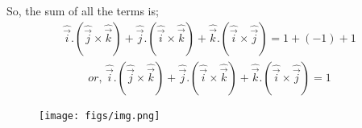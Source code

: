 \documentclass{beamer}
\providecommand{\brak}[1]{\ensuremath{\left(#1\right)}}
\theoremstyle{remark}
\numberwithin{equation}{section}
\begin{document}
\begin{frame}
So, the sum of all the terms is;
\begin{align}
\hat{\Vec{i}}.\brak{\hat{\Vec{j}} \times \hat{\Vec{k}}} + \hat{\Vec{j}}.\brak{\hat{\Vec{i}} \times \hat{\Vec{k}}} + \hat{\Vec{k}}.\brak{\hat{\Vec{i}} \times \hat{\Vec{j}}} = 1 + (-1) + 1
\end{align}
\begin{align}
or, \, \hat{\Vec{i}}.\brak{\hat{\Vec{j}} \times \hat{\Vec{k}}} + \hat{\Vec{j}}.\brak{\hat{\Vec{i}} \times \hat{\Vec{k}}} + \hat{\Vec{k}}.\brak{\hat{\Vec{i}} \times \hat{\Vec{j}}} = 1
\end{align}
\end{frame}

\begin{frame}
\begin{figure}[H]
\centering
\texttt{[image: figs/img.png]}
\caption*{}
\end{figure}
\end{frame}
\end{document}
